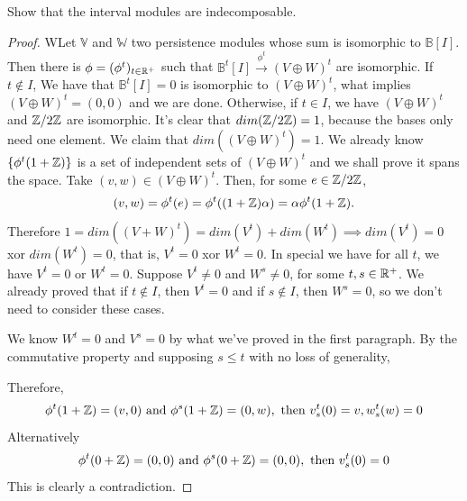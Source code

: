 \noindent\linia

\begin{exercise}
    Show that the interval modules are indecomposable.
\end{exercise}

\begin{proof}
    WLet $\mathbb{V}$ and $\mathbb{W}$ two persistence modules whose sum is isomorphic to $\mathbb{B}[I]$. Then there is $\phi = (\phi^t)_{t \in
    \mathbb{R}^+}$ such that $\mathbb{B}^t[I] \overset{\phi^t}{\to} (V \oplus W)^t$ are
    isomorphic. If $t \not \in I$, We have that $\mathbb{B}^t[I] = 0$ is
    isomorphic to  $(V \oplus W)^t$, what implies $(V \oplus W)^t = (0,0)$ and
    we are done. Otherwise, if $t \in I$, we have $(V \oplus W)^t$ and
    $\mathbb{Z}/2\mathbb{Z}$ are isomorphic. It's clear that $dim(\mathbb{Z}/2\mathbb{Z}) = 1$, because the
    bases only need one element. We claim that $dim((V \oplus W)^t) = 1$. We
    already know $\{\phi^t(1 + \mathbb{Z})\}$ is a set of independent sets of $(V
    \oplus W)^t$ and we shall prove it spans the space. Take $(v,w) \in (V
    \oplus W)^t$. Then, for some $e \in \mathbb{Z}/2\mathbb{Z}$,
    $$
    (v,w) = \phi^t(e) = \phi^t((1 + \mathbb{Z})\alpha) = \alpha \phi^t(1 + \mathbb{Z}).
    $$
    Therefore $1 = dim((V + W)^t) = dim(V^t) + dim(W^t) \implies dim(V^t) = 0$
    xor $dim(W^t) = 0$, that is, $V^t = 0$ xor $W^t = 0$. In special we have for
    all $t$, we have $V^t = 0$ or $W^t = 0$.  Suppose $V^t \neq 0$ and $W^s
    \neq 0$, for some $t,s \in \mathbb{R}^+$. We already proved that if $t \not \in
    I$, then $V^t = 0$ and if $s \not \in I$, then $W^s = 0$, so we don't need
    to consider these cases. 

    We know $W^t = 0$ and $V^s = 0$ by what we've proved in the first
    paragraph. By the commutative property and supposing $s \le t$ with no
    loss of generality, 

    \begin{figure}[H]
        \begin{center}
        \end{center}
    \end{figure} 
    Therefore,
    $$
    \phi^t(1 + \mathbb{Z}) = (v,0) \text{ and } \phi^s(1 + \mathbb{Z}) = (0,w), \text{ then } v_s^t(0) = v, w_s^t(w) = 0 
    $$
    Alternatively 
    $$
    \phi^t(0 + \mathbb{Z}) = (0,0) \text{ and } \phi^s(0 + \mathbb{Z}) = (0, 0), \text{ then } v_s^t(0) = 0 
    $$
    This is clearly a contradiction. 
\end{proof}

